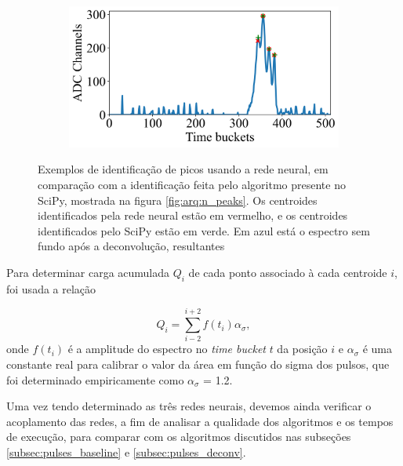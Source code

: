 \documentclass[a4paper,12pt,oneside]{book}
\begin{document}
\begin{figure}[H]
\begin{subfigure}[b]{0.49\textwidth}
        \caption{}
        \label{subfig:exs_n_peaks_3}
    \end{subfigure}%
    \hfill
    \begin{subfigure}[b]{0.465\textwidth}
        \centering
        \includegraphics[scale=0.425]{figs/np_exs4.png}
        \caption{}
        \label{subfig:exs_n_peaks_4}
    \end{subfigure}
\caption{Exemplos de identificação de picos usando a rede neural, em comparação com a identificação feita pelo algoritmo presente no SciPy, mostrada na figura \ref{fig:arq:n_peaks}. Os centroides identificados pela rede neural estão em vermelho, e os centroides identificados pelo SciPy estão em verde. Em azul está o espectro sem fundo após a deconvolução, resultantes }
\label{fig:exs_n_peaks}
\end{figure}

\par Para determinar carga acumulada $Q_i$ de cada ponto associado à cada centroide $i$, foi usada a relação

\begin{equation}\label{eq:carga_acumulada_ml}
	Q_i = \sum_{i - 2}^{i + 2}f(t_i)\alpha_\sigma,
\end{equation}
%
onde $f(t_i)$ é a amplitude do espectro no \textit{time bucket} $t$ da posição $i$ e $\alpha_\sigma$ é uma constante real para calibrar o valor da área em função do sigma dos pulsos, que foi determinado empiricamente como $\alpha_\sigma$ = 1.2.

\par Uma vez tendo determinado as três redes neurais, devemos ainda verificar o acoplamento das redes, a fim de analisar a qualidade dos algoritmos e os tempos de execução, para comparar com os algoritmos discutidos nas subseções \ref{subsec:pulses_baseline} e \ref{subsec:pulses_deconv}.
\end{document}
